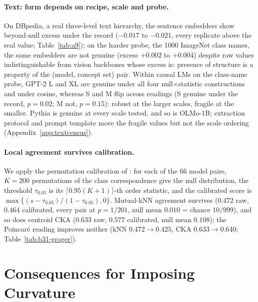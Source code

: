 \documentclass{article}
\begin{document}
\paragraph{Text: form depends on recipe, scale and probe.} On DBpedia, a real three-level text hierarchy, the sentence embedders show beyond-null excess under the record ($-0.017$ to $-0.021$, every replicate above the real value; Table~\ref{tab:a9}); on the harder probe, the 1000 ImageNet class names, the same embedders are not genuine (excess $+0.002$ to $+0.004$) despite raw values indistinguishable from vision backbones whose excess is: presence of structure is a property of the (model, concept set) pair. Within causal LMs on the class-name probe, GPT-2 L and XL are genuine under all four null$\times$statistic constructions and under cosine, whereas S and M flip across readings (S genuine under the record, $p=0.02$; M not, $p=0.15$): robust at the larger scales, fragile at the smaller. Pythia is genuine at every scale tested, and so is OLMo-1B; extraction protocol and prompt template move the fragile values but not the scale ordering (Appendix~\ref{app:textcensus}). %

\paragraph{Local agreement survives calibration.} We apply the permutation calibration of \citet{groger2026aristotelian}: for each of the 66 model pairs, $K{=}200$ permutations of the class correspondence give the null distribution, the threshold $\tau_{0.05}$ is its $\lceil 0.95(K{+}1)\rceil$-th order statistic, and the calibrated score is $\max\{(s-\tau_{0.05})/(1-\tau_{0.05}),0\}$. Mutual-kNN agreement survives ($0.472$ raw, $0.464$ calibrated, every pair at $p=1/201$, null mean $0.010$ = chance $10/999$), and so does centroid CKA ($0.633$ raw, $0.577$ calibrated, null mean $0.108$); the Poincar\'{e} reading improves neither (kNN $0.472\to0.425$, CKA $0.633\to0.640$; Table~\ref{tab:b31-groger}). %

\section{Consequences for Imposing Curvature}
\label{sec:practice}
\end{document}

